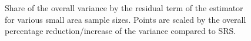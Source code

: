 
\begin{figure}[H]
	\centering
	\caption{Share of the overall variance by the residual term of the \psmall{} estimator for various small area sample sizes. Points are scaled by the overall percentage reduction/increase of the variance compared to SRS.}
	\label{fig:fail}
\end{figure}








